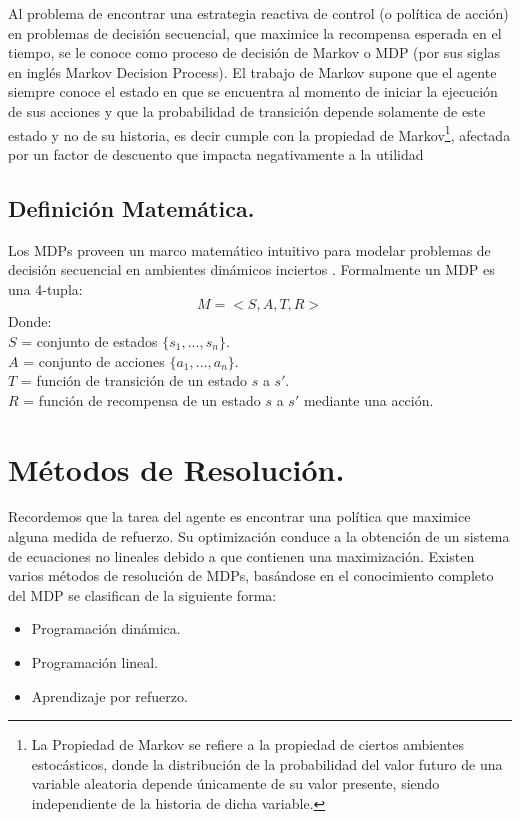 Al problema de encontrar una estrategia reactiva de control (o política de acción) en problemas de decisión secuencial, que maximice la recompensa esperada en el tiempo, se le conoce como proceso de decisión de Markov o MDP (por sus siglas en inglés Markov Decision Process). El trabajo de Markov supone que el agente siempre conoce el estado en que se encuentra al momento de iniciar la ejecución de sus acciones y que la probabilidad de transición depende solamente de este estado y no de su historia, es decir cumple con la propiedad de Markov\footnote{La Propiedad de Markov se refiere a la propiedad de ciertos ambientes estocásticos, donde la distribución de la probabilidad del valor futuro de una variable aleatoria depende únicamente de su valor presente, siendo independiente de la historia de dicha variable.}, afectada por un factor de descuento que impacta negativamente a la utilidad

\subsection{Definición Matemática.}
Los MDPs proveen un marco matemático intuitivo para modelar problemas de decisión secuencial en ambientes dinámicos inciertos . Formalmente un MDP es una 4-tupla:
$$M=< S,A,T,R >$$
Donde:\\
$S$ = conjunto de estados $\{s_{1},...,s_{n}\}$.\\
$A$ = conjunto de acciones $\{a_{1},...,a_{n}\}$.\\
$T$ = función de transición de un estado $s$ a $s'$.\\
$R$ = función de recompensa de un estado $s$ a $s'$ mediante una acción.\\

\section{Métodos de Resolución.}
Recordemos que la tarea del agente es encontrar una política que maximice alguna medida de refuerzo. Su optimización conduce a la obtención de un sistema de ecuaciones no lineales debido a que contienen una maximización. Existen varios métodos de resolución de MDPs, basándose en el conocimiento completo del MDP se clasifican de la siguiente forma:

\begin{itemize}
\item Programación dinámica.
\item Programación lineal.
\item Aprendizaje por refuerzo.
\end{itemize}


